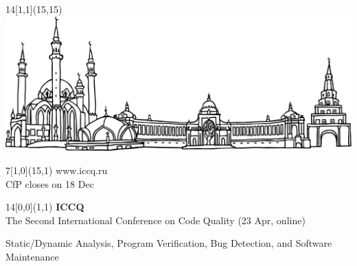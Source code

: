 \documentclass{article}
\begin{document}
\selectfont
\raggedbottom
\raggedright
\setlength{\topskip}{6pt}
\setlength{\parindent}{0pt} %
\setlength{\parskip}{6pt} %
\color{xblack}

\begin{textblock}{14}[1,1](15,15)
  \raggedleft
  \includegraphics[width=14\TPHorizModule]{../../cfp/kazan}
\end{textblock}

\begin{textblock}{7}[1,0](15,1)
  \raggedleft\large
  www.iccq.ru \\
  CfP closes on 18 Dec
\end{textblock}

\begin{textblock}{14}[0,0](1,1)
  {
  \fontsize{42}{42}
  \selectfont
  \bfseries
  ICCQ
  }\\[12pt]

  \Large
  The Second International Conference \newline
  on Code Quality (23 Apr, online)

  Static/Dynamic Analysis, Program Verification, \newline
  Bug Detection, and Software Maintenance
\end{textblock}
\end{document}
